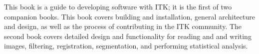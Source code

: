 This book is a guide to developing software with ITK; it is the first of two
companion books. This book covers building and installation, general
architecture and design, as well as the process of contributing in the ITK
community.  The second book covers detailed design and functionality for
reading and and writing images, filtering, registration, segmentation, and
performing statistical analysis.
